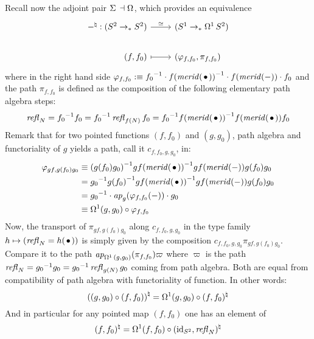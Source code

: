 \documentclass[english,a4]{article}
\begin{document}
Recall now the adjoint pair $\operatorname{\Sigma}{}\dashv\mathop{\Omega^{}}$, which
provides an equivalence
\begin{equation}
  \label{eq:24}
  \begin{tikzcd}[%
    /tikz/column 1/.append style={anchor=base east},%
    /tikz/column 2/.append style={anchor=base west}]
    \blank^\natural : (\Sp \ptdto \Sp) \rar["\weq"] & (\Sc \ptdto
    \loopspace 1 \Sp)
    \\
    (f,f_0) \rar[mapsto] & (\varphi_{f,f_0}, \pi_{f,f_0})
  \end{tikzcd}
\end{equation}
where in the right hand side
$\varphi_{f,f_0} \defequi\inv{f_0}\cdot \inv{f(\mrd(\base))}\cdot
f(\mrd(\blank))\cdot f_0$ and the path $\pi_{f,f_0}$ is defined as the
composition of the following elementary path algebra steps:
\begin{equation}
  \label{eq:16}
  \refl N = \inv{f_0}f_0 = \inv{f_0}\refl {f(N)} f_0 =  \inv{f_0}\inv{f(\mrd(\base))}f(\mrd(\base)) f_0
\end{equation}
Remark that for two pointed functions $(f,f_0)$ and $(g,g_0)$, path
algebra and functoriality of $g$ yields a path, call it
$c_{f,f_0,g,g_0}$, in:
\begin{equation}
  \begin{aligned}
    \varphi_{gf,g(f_0)g_0} %
    &\jdeq \inv{(g(f_0)g_0)}\inv{gf(\mrd(\base))} gf(\mrd(\blank))
    g(f_0)g_0
    \\
    &= \inv{g_0}\inv{g(f_0)}\inv{gf(\mrd(\base))} gf(\mrd(\blank))
    g(f_0)g_0
    \\
    &= \inv{g_0} \cdot \ap g (\varphi_{f,f_0}(\blank)) \cdot g_0
    \\
    &\jdeq \loopspace 1 (g,g_0) \circ \varphi_{f,f_0}
  \end{aligned}\label{eq:26}
\end{equation}
Now, the transport of $\pi_{gf,g(f_0)g_0}$ along $c_{f,f_0,g,g_0}$ in
the type family $h\mapsto (\refl N = h(\base))$ is simply given by the
composition $c_{f,f_0,g,g_0}\pi_{gf,g(f_0)g_0}$. Compare it to the
path $\mathop{{\it ap}_{\mathop{\Omega^{1}}{(g,g_0)}}}(\pi_{f,f_0})\varpi$ where $\varpi$ is
the path $\mathop{{\mathit{refl}}_{N}} = {g_0}^{-1}g_0 = {g_0}^{-1}\mathop{{\mathit{refl}}_{g(N)}}g_0$ coming
from path algebra. Both are equal from compatibility of path algebra
with functoriality of function. In other words:
\begin{equation}
  \label{eq:27}
  {\left((g,g_0)\circ (f,f_0)\right)}^\natural = \mathop{\Omega^{1}} (g,g_0) \circ (f,f_0)^\natural 
\end{equation}
And in particular for any pointed map $(f,f_0)$ one has an element of
\begin{displaymath}
  (f,f_0)^\natural = \mathop{\Omega^{1}} (f,f_0) \circ
  (\mathord{\mathrm{id}}_{{S^2}},\mathop{{\mathit{refl}}_{N}})^\natural
\end{displaymath}
\end{document}
